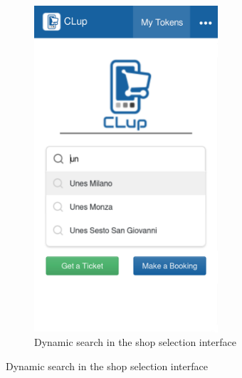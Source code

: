 \begin{figure}[H]
\begin{subfigure}{0.5\textwidth}
        \includegraphics[width=0.75\textwidth]{Images/search-mockup.png}
        \caption{Dynamic search in the shop selection interface}
    \end{subfigure}
\end{figure}

